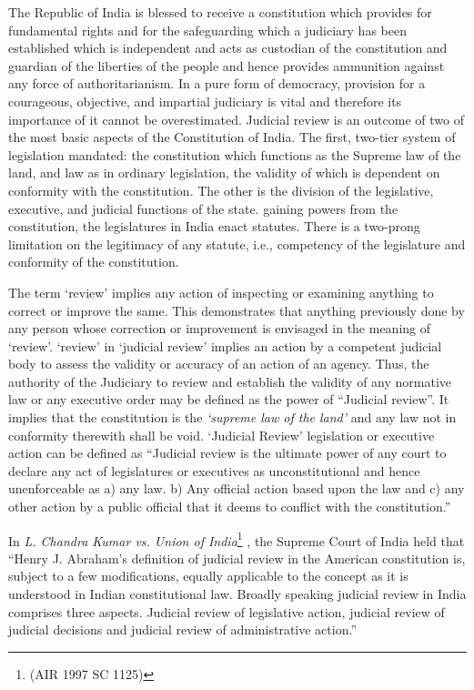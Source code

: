 \begin{multicols}{2}
\noi
The Republic of India is blessed to receive a constitution which provides for
fundamental rights and for the safeguarding which a judiciary has been established which is independent and acts as custodian of the constitution and guardian of the
liberties of the people and hence provides ammunition against any force of
authoritarianism. In a pure form of democracy, provision for a courageous, objective,
and impartial judiciary is vital and therefore its importance of it cannot be overestimated. Judicial review is an outcome of two of the most basic aspects of the
Constitution of India. The first, two-tier system of legislation mandated: the
constitution which functions as the Supreme law of the land, and law as in ordinary
legislation, the validity of which is dependent on conformity with the constitution. The
other is the division of the legislative, executive, and judicial functions of the state.
gaining powers from the constitution, the legislatures in India enact statutes. There is a
two-prong limitation on the legitimacy of any statute, i.e., competency of the
legislature and conformity of the constitution. 


\noi
The term ‘review’ implies any action of inspecting or examining anything to
correct or improve the same. This demonstrates that anything previously done by any
person whose correction or improvement is envisaged in the meaning of ‘review’.
‘review’ in ‘judicial review’ implies an action by a competent judicial body to assess
the validity or accuracy of an action of an agency. Thus, the authority of the Judiciary
to review and establish the validity of any normative law or any executive order may
be defined as the power of “Judicial review”. It implies that the constitution is the
\textit{‘supreme law of the land’} and any law not in conformity therewith shall be void.
‘Judicial Review’ legislation or executive action can be defined as “Judicial review is
the ultimate power of any court to declare any act of legislatures or executives as
unconstitutional and hence unenforceable as a) any law. b) Any official action based
upon the law and c) any other action by a public official that it deems to conflict with
the constitution.”

\noi
In \textit{L. Chandra Kumar vs. Union of India}\footnote{
(AIR 1997 SC 1125)}
, the Supreme Court of India held that
“Henry J. Abraham’s definition of judicial review in the American constitution is,
subject to a few modifications, equally applicable to the concept as it is understood in
Indian constitutional law. Broadly speaking judicial review in India comprises three aspects. Judicial review of legislative action, judicial review of judicial decisions and
judicial review of administrative action.”


\end{multicols}
